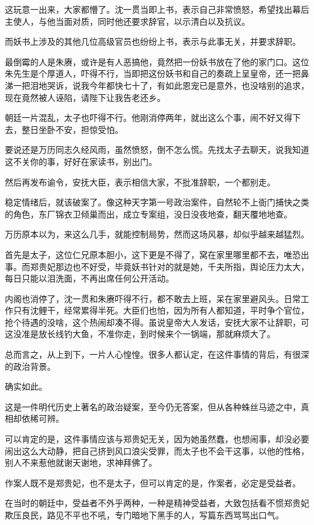 \begin{multicols}{\theparacolNo}
这玩意一出来，大家都懵了。沈一贯当即上书，表示自己非常愤怒，希望找出幕后主使人，与他当面对质，同时他还要求辞官，以示清白以及抗议。

而妖书上涉及的其他几位高级官员也纷纷上书，表示与此事无关，并要求辞职。

最倒霉的人是朱赓，或许是有人恶搞他，竟然把一份妖书放在了他的家门口。这位朱先生是个厚道人，吓得不行，当即把这份妖书和自己的奏疏上呈皇帝，还一把鼻涕一把泪地哭诉，说我今年都快七十了，有如此恩宠已是意外，也没啥别的追求，现在竟然被人诬陷，请陛下让我告老还乡。

朝廷一片混乱，太子也吓得不行。他刚消停两年，就出这么个事，闹不好又得下去，整日坐卧不安，担惊受怕。

要说还是万历同志久经风雨，虽然愤怒，倒不怎么慌。先找太子去聊天，说我知道这不关你的事，好好在家读书，别出门。

然后再发布谕令，安抚大臣，表示相信大家，不批准辞职，一个都别走。

稳定情绪后，就该破案了。像这种天字第一号政治案件，自然轮不上衙门捕快之类的角色，东厂锦衣卫倾巢而出，成立专案组，没日没夜地查，翻天覆地地查。

万历原本以为，来这么几手，就能控制局势，然而这场风暴，却似乎越来越猛烈。

首先是太子，这位仁兄原本胆小，这下更是不得了，窝在家里哪里都不去，唯恐出事。而郑贵妃那边也不好受，毕竟妖书针对的就是她，千夫所指，舆论压力太大，每日只能以泪洗面，不再出席任何公开活动。

内阁也消停了，沈一贯和朱赓吓得不行，都不敢去上班，呆在家里避风头。日常工作只有沈鲤干，经常累得半死。大臣们也怕，因为所有人都知道，平时争个官位，抢个待遇的没啥，这个热闹却凑不得。虽说皇帝大人发话，安抚大家不让辞职，可这没准是放长线钓大鱼，不准你走，到时候来个一锅端，那就麻烦大了。

总而言之，从上到下，一片人心惶惶。很多人都认定，在这件事情的背后，有很深的政治背景。

确实如此。

这是一件明代历史上著名的政治疑案，至今仍无答案，但从各种蛛丝马迹之中，真相却依稀可辨。

可以肯定的是，这件事情应该与郑贵妃无关，因为她虽然蠢，也想闹事，却没必要闹出这么大动静，把自己挤到风口浪尖受罪，而太子也不会干这事，以他的性格，别人不来惹他就谢天谢地，求神拜佛了。

作案人既不是郑贵妃，也不是太子，但可以肯定的是，作案者，必定是受益者。

在当时的朝廷中，受益者不外乎两种，一种是精神受益者，大致包括看不惯郑贵妃欺压良民，路见不平也不吼，专门暗地下黑手的人，写篇东西骂骂出口气。


\end{multicols}
